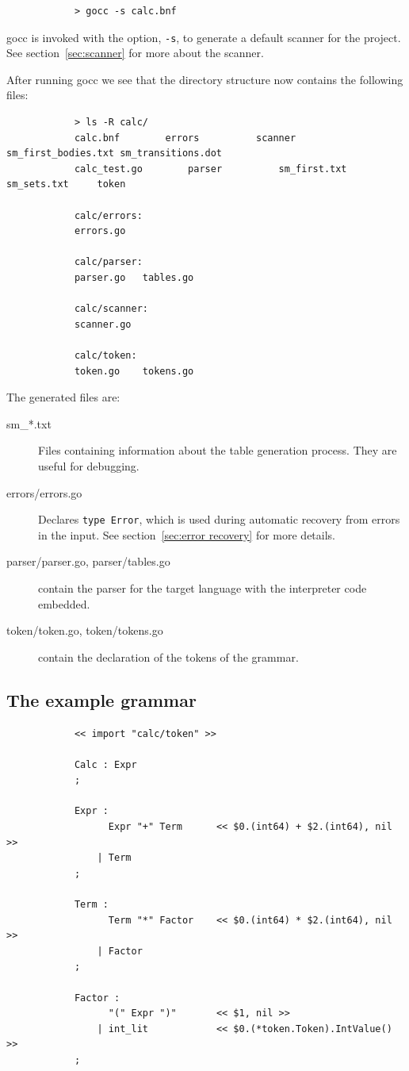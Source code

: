 \documentclass[12pt]{article}
\begin{document}
		\begin{verbatim}
			> gocc -s calc.bnf
		\end{verbatim}

		gocc is invoked with the option, \verb|-s|, to generate a default scanner for the project. See section~\ref{sec:scanner} for more about the scanner.

		After running gocc we see that the directory structure now contains the following files:

		\begin{verbatim}
			> ls -R calc/
			calc.bnf		errors			scanner			sm_first_bodies.txt	sm_transitions.dot
			calc_test.go		parser			sm_first.txt		sm_sets.txt		token

			calc/errors:
			errors.go

			calc/parser:
			parser.go	tables.go

			calc/scanner:
			scanner.go

			calc/token:
			token.go	tokens.go
		\end{verbatim}

		The generated files are:
		\begin{description}
			\item[sm\_*.txt] Files containing information about the table generation process. They are useful for debugging.

			\item[errors/errors.go] Declares \verb|type Error|, which is used during automatic recovery from errors in the input. See section~\ref{sec:error recovery} for more details.

			\item[parser/parser.go, parser/tables.go] contain the parser for the target language with the interpreter code embedded.

			\item[token/token.go, token/tokens.go] contain the declaration of the tokens of the grammar.
		\end{description}

	\subsection{The example grammar}
		\begin{verbatim}
			<< import "calc/token" >>

			Calc : Expr              
			;

			Expr :
			      Expr "+" Term      << $0.(int64) + $2.(int64), nil >>
			    | Term			
			;

			Term :
			      Term "*" Factor    << $0.(int64) * $2.(int64), nil >>
			    | Factor			
			;

			Factor :
			      "(" Expr ")"       << $1, nil >>
			    | int_lit            << $0.(*token.Token).IntValue() >>
			;
		\end{verbatim}
\end{document}
